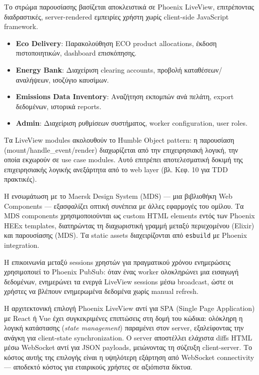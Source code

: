 Το στρώμα παρουσίασης βασίζεται αποκλειστικά σε Phoenix LiveView,
επιτρέποντας διαδραστικές, server-rendered εμπειρίες χρήστη χωρίς
client-side JavaScript framework.

\begin{itemize}
\tightlist
\item
  \textbf{Eco Delivery}: Παρακολούθηση ECO product allocations, έκδοση
  πιστοποιητικών, dashboard επισκόπησης.
\item
  \textbf{Energy Bank}: Διαχείριση clearing accounts, προβολή
  καταθέσεων/αναλήψεων, ισοζύγιο καυσίμων.
\item
  \textbf{Emissions Data Inventory}: Αναζήτηση εκπομπών ανά πελάτη,
  export δεδομένων, ιστορικά reports.
\item
  \textbf{Admin}: Διαχείριση ρυθμίσεων συστήματος, worker configuration,
  user roles.
\end{itemize}

Τα LiveView modules ακολουθούν το Humble Object pattern: η παρουσίαση
(mount/handle\_event/render) διαχωρίζεται από την επιχειρησιακή λογική,
την οποία εκχωρούν σε use case modules. Αυτό επιτρέπει αποτελεσματική
δοκιμή της επιχειρησιακής λογικής ανεξάρτητα από το web layer (βλ. Κεφ.
10 για TDD πρακτικές).

Η ενσωμάτωση με το Maersk Design System (MDS) --- μια βιβλιοθήκη Web
Components --- εξασφαλίζει οπτική συνέπεια με άλλες εφαρμογές του
ομίλου. Τα MDS components χρησιμοποιούνται ως custom HTML elements εντός
των Phoenix HEEx templates, διατηρώντας τη διαχωριστική γραμμή μεταξύ
περιεχομένου (Elixir) και παρουσίασης (MDS). Τα static assets
διαχειρίζονται από \texttt{esbuild} με Phoenix integration.

Η επικοινωνία μεταξύ sessions χρηστών για πραγματικού χρόνου ενημερώσεις
χρησιμοποιεί το Phoenix PubSub: όταν ένας worker ολοκληρώνει μια
εισαγωγή δεδομένων, ενημερώνει τα ενεργά LiveView sessions μέσω
broadcast, ώστε οι χρήστες να βλέπουν ενημερωμένα δεδομένα χωρίς manual
refresh.

Η αρχιτεκτονική επιλογή Phoenix LiveView αντί για SPA (Single Page
Application) με React ή Vue έχει συγκεκριμένες επιπτώσεις στη δομή του
κώδικα: ολόκληρη η λογική κατάστασης (\emph{state management}) παραμένει
στον server, εξαλείφοντας την ανάγκη για client-state synchronization. Ο
server αποστέλλει ελάχιστα diffs HTML μέσω WebSocket αντί για JSON
payloads, μειώνοντας τη σύζευξη client-server. Το κόστος αυτής της
επιλογής είναι η υψηλότερη εξάρτηση από WebSocket connectivity ---
αποδεκτό κόστος για εταιρικούς χρήστες σε αξιόπιστα δίκτυα.


